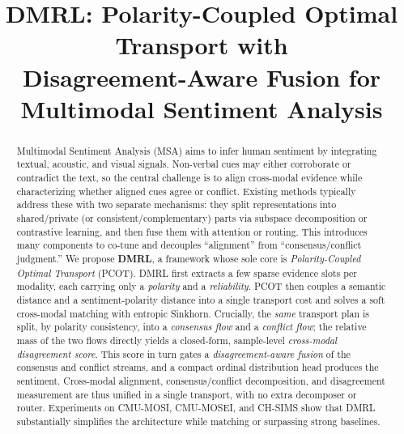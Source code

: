 \documentclass[conference]{IEEEtran}
\begin{document}
\title{DMRL: Polarity-Coupled Optimal Transport with\\
Disagreement-Aware Fusion for Multimodal Sentiment Analysis}

\author{
}

\maketitle

\begin{abstract}
Multimodal Sentiment Analysis (MSA) aims to infer human sentiment by integrating
textual, acoustic, and visual signals. Non-verbal cues may either corroborate or
contradict the text, so the central challenge is to align cross-modal evidence
while characterizing whether aligned cues agree or conflict. Existing methods
typically address these with two separate mechanisms: they split representations
into shared/private (or consistent/complementary) parts via subspace decomposition
or contrastive learning, and then fuse them with attention or routing. This
introduces many components to co-tune and decouples ``alignment'' from
``consensus/conflict judgment.'' We propose \textbf{DMRL}, a framework whose sole
core is \emph{Polarity-Coupled Optimal Transport} (PCOT). DMRL first extracts a few
sparse evidence slots per modality, each carrying only a \emph{polarity} and a
\emph{reliability}. PCOT then couples a semantic distance and a sentiment-polarity
distance into a single transport cost and solves a soft cross-modal matching with
entropic Sinkhorn. Crucially, the \emph{same} transport plan is split, by polarity
consistency, into a \emph{consensus flow} and a \emph{conflict flow}; the relative
mass of the two flows directly yields a closed-form, sample-level \emph{cross-modal
disagreement score}. This score in turn gates a \emph{disagreement-aware fusion} of
the consensus and conflict streams, and a compact ordinal distribution head
produces the sentiment. Cross-modal alignment, consensus/conflict decomposition,
and disagreement measurement are thus unified in a single transport, with no extra
decomposer or router. Experiments on CMU-MOSI, CMU-MOSEI, and CH-SIMS show that
DMRL substantially simplifies the architecture while matching or surpassing strong
baselines.
\end{abstract}
\end{document}
